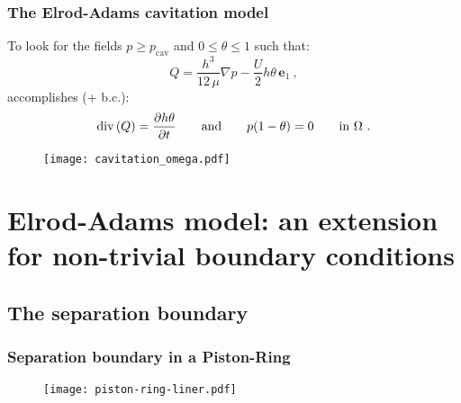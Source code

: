 \documentclass[10pt,aspectratio=169]{beamer}
\begin{document}



\begin{frame}
\frametitle{The Elrod-Adams cavitation model}
\vspace*{1.0cm}
To look for the fields $p\geq p_{\text{cav}}$ and $0\leq \theta \leq 1$ such that: $$Q=\frac{h^3}{12\,\mu} \nabla p - \frac{U}{2}h\theta \, \mathbf{e}_1~,$$ accomplishes (+ b.c.): $$\text{div} \left( Q \right) =\frac{\partial h\theta }{\partial t}\qquad \mbox{and}\qquad p(1-\theta)=0 \qquad \mbox{in }  \Omega~.$$

\begin{figure}
	\centering
	\texttt{[image: cavitation\_omega.pdf]}
\end{figure}
\end{frame}


\setcounter{showSlideNumbers}{0}
\section{Elrod-Adams model: an extension for non-trivial boundary conditions}
\subsection{The separation boundary}
\begin{frame}[noframenumbering]

\tableofcontents[
currentsection,
currentsubsection,
subsectionstyle=show/shaded/hide
]
\end{frame}
\setcounter{showSlideNumbers}{1}

\begin{frame}
\frametitle{Separation boundary in a Piston-Ring}
\vspace*{1.0cm}
\begin{figure}
	\centering
	\texttt{[image: piston-ring-liner.pdf]}
\end{figure}
\end{frame}
\end{document}
